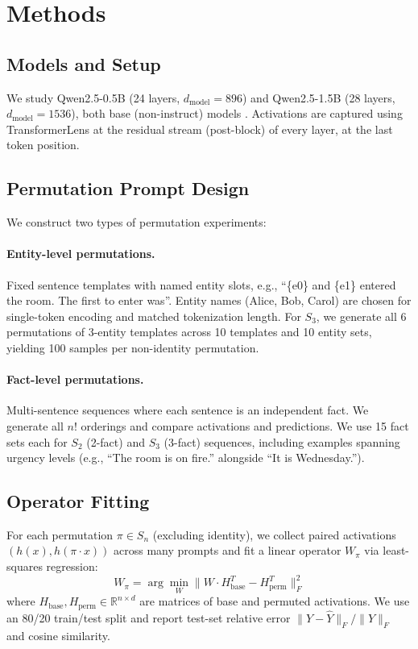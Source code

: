 \documentclass[10pt, letterpaper]{article}
\begin{document}
\section{Methods}
\label{sec:methods}

\subsection{Models and Setup}

We study Qwen2.5-0.5B (24 layers, $d_\text{model} = 896$) and Qwen2.5-1.5B (28 layers, $d_\text{model} = 1536$), both base (non-instruct) models \cite{qwen2025}. Activations are captured using TransformerLens \cite{nanda2022transformerlens} at the residual stream (post-block) of every layer, at the last token position.

\subsection{Permutation Prompt Design}

We construct two types of permutation experiments:

\paragraph{Entity-level permutations.} Fixed sentence templates with named entity slots, e.g., ``\{e0\} and \{e1\} entered the room. The first to enter was''. Entity names (Alice, Bob, Carol) are chosen for single-token encoding and matched tokenization length. For $S_3$, we generate all 6 permutations of 3-entity templates across 10 templates and 10 entity sets, yielding 100 samples per non-identity permutation.

\paragraph{Fact-level permutations.} Multi-sentence sequences where each sentence is an independent fact. We generate all $n!$ orderings and compare activations and predictions. We use 15 fact sets each for $S_2$ (2-fact) and $S_3$ (3-fact) sequences, including examples spanning urgency levels (e.g., ``The room is on fire.'' alongside ``It is Wednesday.'').

\subsection{Operator Fitting}

For each permutation $\pi \in S_n$ (excluding identity), we collect paired activations $(h(x), h(\pi \cdot x))$ across many prompts and fit a linear operator $W_\pi$ via least-squares regression:
\begin{equation}
    W_\pi = \arg\min_W \|W \cdot H_\text{base}^T - H_\text{perm}^T\|_F^2
\end{equation}
where $H_\text{base}, H_\text{perm} \in \mathbb{R}^{n \times d}$ are matrices of base and permuted activations. We use an 80/20 train/test split and report test-set relative error $\|Y - \hat{Y}\|_F / \|Y\|_F$ and cosine similarity.
\end{document}
